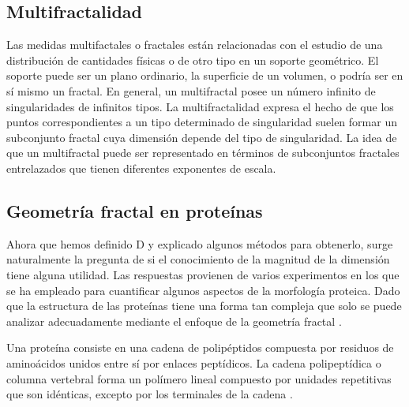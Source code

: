 \documentclass[11pt]{article}
\begin{document}
\subsection{Multifractalidad}

Las medidas multifactales o fractales est\'{a}n relacionadas con el estudio de una distribuci\'{o}n de cantidades f\'{i}sicas o de otro tipo en un soporte geom\'{e}trico. El soporte puede ser un plano ordinario, la superficie de un volumen, o podr\'{i}a ser en s\'{i} mismo un fractal. En general, un multifractal posee un n\'{u}mero infinito de singularidades de infinitos tipos. La multifractalidad expresa el hecho de que los puntos correspondientes a un tipo determinado de singularidad suelen formar un subconjunto fractal cuya dimensi\'{o}n depende del tipo de singularidad. La idea de que un multifractal puede ser representado en t\'{e}rminos de subconjuntos fractales entrelazados que tienen diferentes exponentes de escala.

\subsection{Geometr\'{i}a fractal en prote\'{i}nas}

Ahora que hemos definido D y explicado algunos m\'{e}todos para obtenerlo, surge naturalmente la pregunta de si el conocimiento de la magnitud de la dimensi\'{o}n tiene alguna utilidad. Las respuestas provienen de varios experimentos en los que se ha empleado para cuantificar algunos aspectos de la morfolog\'{i}a proteica. Dado que la estructura de las prote\'{i}nas tiene una forma tan compleja que solo se puede analizar adecuadamente mediante el enfoque de la geometr\'{i}a fractal \cite{Mustafa1996}. 

Una prote\'{i}na consiste en una cadena de polip\'{e}ptidos compuesta por residuos de amino\'{a}cidos unidos entre s\'{i} por enlaces pept\'{i}dicos. La cadena polipept\'{i}dica o columna vertebral forma un pol\'{i}mero lineal compuesto por unidades repetitivas que son id\'{e}nticas, excepto por los terminales de la cadena \cite{Mustafa1996}.
\end{document}
